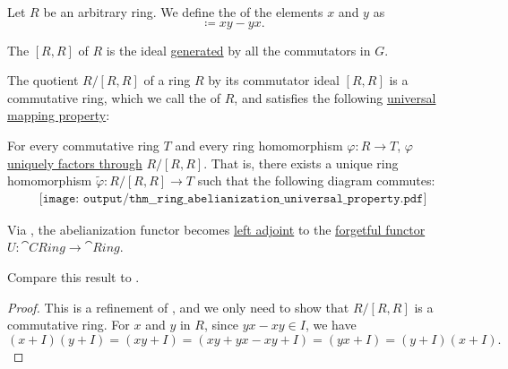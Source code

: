 \begin{definition}\label{def:ring_commutator}
  Let \( R \) be an arbitrary ring. We define the  of the elements \( x \) and \( y \) as
  \begin{equation*}
    [x, y] \coloneqq xy - yx.
  \end{equation*}

  The  \( [R, R] \) of \( R \) is the ideal \hyperref[def:generated_ring_ideal]{generated} by all the commutators in \( G \).
\end{definition}

\begin{proposition}\label{thm:ring_abelianization_universal_property}
  The quotient \( R / [R, R] \) of a ring \( R \) by its commutator ideal \( [R, R] \) is a commutative ring, which we call the  of \( R \), and satisfies the following \hyperref[rem:universal_mapping_property]{universal mapping property}:
  \begin{displayquote}
    For every commutative ring \( T \) and every ring homomorphism \( \varphi: R \to T \), \( \varphi \) \hyperref[def:factors_through]{uniquely factors through} \( R / [R, R] \). That is, there exists a unique ring homomorphism \( \widetilde{\varphi}: R / [R, R] \to T \) such that the following diagram commutes:
    \begin{equation}\label{eq:thm:ring_abelianization_universal_property/diagram}
      \begin{aligned}
        \texttt{[image: output/thm\_\_ring\_abelianization\_universal\_property.pdf]}
      \end{aligned}
    \end{equation}
  \end{displayquote}

  Via , the abelianization functor becomes \hyperref[def:category_adjunction]{left adjoint} to the \hyperref[def:concrete_category]{forgetful functor} \( U: \cat{CRing} \to \cat{Ring} \).

  Compare this result to .
\end{proposition}
\begin{proof}
  This is a refinement of , and we only need to show that \( R / [R, R] \) is a commutative ring. For \( x \) and \( y \) in \( R \), since \( yx - xy \in I \), we have
  \begin{equation*}
    (x + I) (y + I)
    =
    (xy + I)
    =
    (xy + yx - xy + I)
    =
    (yx + I)
    =
    (y + I) (x + I).
  \end{equation*}
\end{proof}


